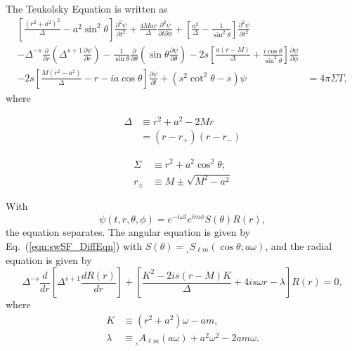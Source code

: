 \documentclass[11pt]{article}
\newcommand{\swS}[5][]{{}_{{}_{#2}}S^{#1}_{#3}(#4;#5)}
\newcommand{\scA}[4][]{{}_{{}_{#2}}A^{#1}_{#3}(#4)}
\begin{document}
\newpage
{}
\vspace{0.25in}

The Teukolsky Equation is written as
\begin{equation}
\begin{aligned}
\left[\frac{(r^2+a^2)^2}{\Delta} - a^2\sin^2\theta\right]
   \frac{\partial^2\psi}{\partial{t}^2}
+ \frac{4Mar}{\Delta}\frac{\partial^2\psi}{\partial{t}\partial\phi}
+ \left[\frac{a^2}{\Delta} - \frac1{\sin^2\theta}\right]
   \frac{\partial^2\psi}{\partial{t}^2} &\\
- \Delta^{-s}\frac{\partial}{\partial{r}}\left(
    \Delta^{s+1}\frac{\partial\psi}{\partial{r}}\right)
-  \frac1{\sin\theta}\frac{\partial}{\partial\theta}\left(
   \sin\theta\frac{\partial\psi}{\partial\theta}\right)
- 2s\left[\frac{a(r-M)}{\Delta} + \frac{i\cos\theta}{\sin^2\theta}\right]
     \frac{\partial\psi}{\partial\phi} &\\
- 2s\left[\frac{M(r^2-a^2)}{\Delta} - r - ia\cos\theta\right]
     \frac{\partial\psi}{\partial{t}}
+ (s^2\cot^2\theta - s)\psi
&= 4\pi\Sigma T,
\end{aligned}
\end{equation}
where\\
\parbox{3.75in}{
\begin{align}
  \Delta &\equiv r^2 + a^2 - 2Mr \nonumber \\
         &= (r-r_+)(r-r_\minus)
\end{align}
}
\parbox{3.75in}{
\begin{align}
  \Sigma &\equiv r^2 + a^2\cos^2\theta; \\
    r_\pm &\equiv M \pm \sqrt{M^2 - a^2}
\end{align}
}

With
\begin{equation}
  \psi(t,r,\theta,\phi) = e^{-i\omega{t}} e^{im\phi}S(\theta)R(r),
\end{equation}
the equation separates.  The angular equation is given by
Eq.~(\ref{eqn:swSF_DiffEqn}) with $S(\theta) =
\swS{s}{\ell{m}}{\cos\theta}{a\omega}$, and the radial equation
is given by
\begin{equation}\label{eqn:radialR:Diff_Eqn}
\Delta^{-s}\frac{d}{dr}\left[\Delta^{s+1}\frac{dR(r)}{dr}\right]
+ \left[\frac{K^2 -2is(r-M)K}{\Delta} + 4is\omega{r} - \lambda\right]R(r)=0,
\end{equation}
where
\begin{align}
  K &\equiv (r^2+a^2)\omega - am, \\
  \lambda &\equiv \scA{s}{\ell{m}}{a\omega} + a^2\omega^2 - 2am\omega.
\end{align}
\end{document}
